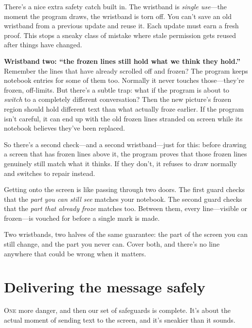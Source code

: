 \documentclass[11pt,twoside]{book}
\begin{document}
There's a nice extra safety catch built in. The wristband is \emph{single
use}---the moment the program draws, the wristband is torn off. You can't
save an old wristband from a previous update and reuse it. Each update must
earn a fresh proof. This stops a sneaky class of mistake where stale
permission gets reused after things have changed.

\textbf{Wristband two: ``the frozen lines still hold what we think they
hold.''} Remember the lines that have already scrolled off and frozen? The
program keeps notebook entries for some of them too. Normally it never touches
those---they're frozen, off-limits. But there's a subtle trap: what if the
program is about to \emph{switch} to a completely different conversation? Then
the new picture's frozen region should hold different text than what actually
froze earlier. If the program isn't careful, it can end up with the old frozen
lines stranded on screen while its notebook believes they've been replaced.

So there's a second check---and a second wristband---just for this: before
drawing a screen that has frozen lines above it, the program proves that those
frozen lines genuinely still match what it thinks. If they don't, it refuses to
draw normally and switches to repair instead.

\begin{pic}
Getting onto the screen is like passing through two doors. The first guard
checks that the \emph{part you can still see} matches your notebook. The
second guard checks that the \emph{part that already froze} matches too.
Between them, every line---visible or frozen---is vouched for before a single
mark is made.
\end{pic}

Two wristbands, two halves of the same guarantee: the part of the screen you
can still change, and the part you never can. Cover both, and there's no line
anywhere that could be wrong when it matters.

\chapter{Delivering the message safely}
\lettrine{O}{ne} more danger, and then our set of safeguards is complete. It's
about the actual moment of sending text to the screen, and it's sneakier than
it sounds.
\end{document}
